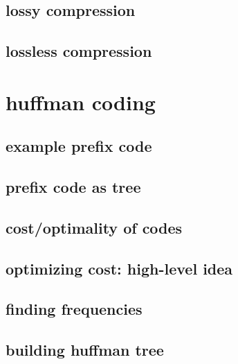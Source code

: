 \subsection{lossy compression}

\subsection{lossless compression}

\section{huffman coding}

\subsection{example prefix code}

\subsection{prefix code as tree}

\subsection{cost/optimality of codes}

\subsection{optimizing cost: high-level idea}


\subsection{finding frequencies}


\subsection{building huffman tree}



